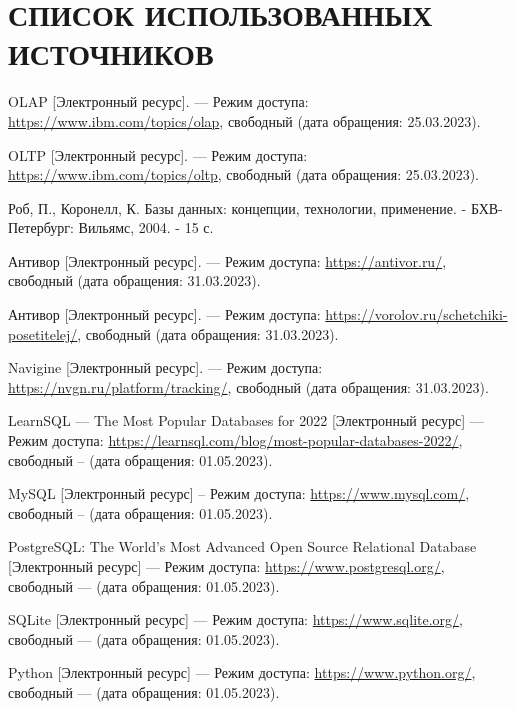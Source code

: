 \section*{СПИСОК ИСПОЛЬЗОВАННЫХ ИСТОЧНИКОВ}
\begingroup
\renewcommand{\section}[2]{}
\begin{thebibliography}{}

    OLAP [Электронный ресурс]. --- Режим доступа:
    \url{https://www.ibm.com/topics/olap}, свободный (дата обращения:
    25.03.2023).

    OLTP [Электронный ресурс]. --- Режим доступа:
    \url{https://www.ibm.com/topics/oltp}, свободный (дата обращения:
    25.03.2023).

    Роб, П., Коронелл, К. Базы данных: концепции, технологии, применение. -
    БХВ-Петербург: Вильямс, 2004. - 15 с.

    Антивор [Электронный ресурс]. --- Режим доступа: \url{https://antivor.ru/},
    свободный (дата обращения: 31.03.2023).

    Антивор [Электронный ресурс]. --- Режим доступа:
    \url{https://vorolov.ru/schetchiki-posetitelej/}, свободный (дата
    обращения:
    31.03.2023).

    Navigine [Электронный ресурс]. --- Режим доступа:
    \url{https://nvgn.ru/platform/tracking/}, свободный (дата обращения:
    31.03.2023).

    LearnSQL --- The Most Popular Databases for 2022 [Электронный ресурс]
    --- Режим доступа:
    \url{https://learnsql.com/blog/most-popular-databases-2022/}, свободный --
    (дата обращения: 01.05.2023).

    MySQL [Электронный ресурс] -- Режим доступа: \url{https://www.mysql.com/},
    свободный -- (дата обращения: 01.05.2023).

    PostgreSQL: The World's Most Advanced Open Source Relational Database
        [Электронный ресурс] --- Режим доступа:
    \url{https://www.postgresql.org/},
    свободный --- (дата обращения: 01.05.2023).

    SQLite [Электронный ресурс] --- Режим доступа: \url{https://www.sqlite.org/}, свободный --- (дата обращения: 01.05.2023).

    Python [Электронный ресурс] --- Режим доступа: \url{https://www.python.org/}, свободный --- (дата обращения: 01.05.2023).

\end{thebibliography}
\endgroup

\pagebreak